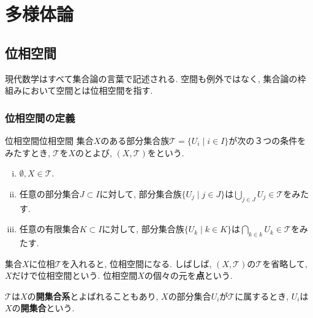 \documentclass[../main.tex]{subfiles}
\begin{document}
\chapter{多様体論}
\section{位相空間}
    現代数学はすべて集合論の言葉で記述される.
    空間も例外ではなく,
    集合論の枠組みにおいて空間とは位相空間を指す.

    \subsection{位相空間の定義}
        \begin{dfn}{位相空間}{位相空間}\label{dfn:topological space}
            集合$X$のある部分集合族$\mathcal{T} = \{U_i \mid i \in I\}$が次の３つの条件をみたすとき, $\mathcal{T}$を$X$のとよび,
            $(X,\mathcal{T})$をという.
            \begin{enumerate}[(i)]
                \item $\emptyset, X \in \mathcal{T}$.
                \item 任意の部分集合$J \subset I$に対して, 部分集合族$\{U_j \mid j \in J\}$は$\bigcup_{j \in J}U_j \in \mathcal{T}$をみたす.
                \item 任意の有限集合$K \subset I$に対して, 部分集合族$\{U_k \mid k \in K\}$は$\bigcap_{k \in k}U_k \in \mathcal{T}$をみたす.
            \end{enumerate}
        \end{dfn}
        集合$X$に位相$\mathcal{T}$を入れると, 位相空間になる. しばしば, $(X,\mathcal{T})$の$\mathcal{T}$を省略して, $X$だけで位相空間という.
        位相空間$X$の個々の元を\textbf{点}という.

        $\mathcal{T}$は$X$の\textbf{開集合系}とよばれることもあり, $X$の部分集合$U_i$が$\mathcal{T}$に属するとき, $U_i$は$X$の\textbf{開集合}という.
\end{document}
